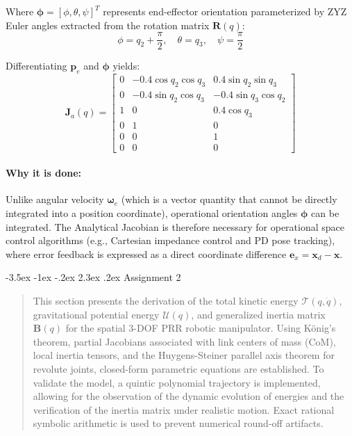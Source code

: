 \documentclass[11pt, a4paper]{article}
\makeatletter
\renewcommand{\section}{\@startsection{section}{1}{\z@}%
    {-3.5ex \@plus -1ex \@minus -.2ex}%
    {2.3ex \@plus .2ex}%
    {\normalfont\Large\bfseries\color{brandblue}}}
\makeatother
\begin{document}
Where $\boldsymbol{\phi} = [\phi, \theta, \psi]^T$ represents end-effector orientation parameterized by ZYZ Euler angles extracted from the rotation matrix $\mathbf{R}(q)$:
\begin{equation}
    \phi = q_2 + \frac{\pi}{2}, \quad \theta = q_3, \quad \psi = \frac{\pi}{2}
\end{equation}

Differentiating $\mathbf{p}_e$ and $\boldsymbol{\phi}$ yields:
\begin{equation}
\mathbf{J}_a(q) = \begin{bmatrix}
0 & -0.4 \cos q_2 \cos q_3 & 0.4 \sin q_2 \sin q_3 \\
0 & -0.4 \sin q_2 \cos q_3 & -0.4 \sin q_3 \cos q_2 \\
1 & 0 & 0.4 \cos q_3 \\
0 & 1 & 0 \\
0 & 0 & 1 \\
0 & 0 & 0
\end{bmatrix}
\end{equation}

\paragraph{Why it is done:}
Unlike angular velocity $\boldsymbol{\omega}_e$ (which is a vector quantity that cannot be directly integrated into a position coordinate), operational orientation angles $\boldsymbol{\phi}$ can be integrated. The Analytical Jacobian is therefore necessary for operational space control algorithms (e.g., Cartesian impedance control and PD pose tracking), where error feedback is expressed as a direct coordinate difference $\mathbf{e}_x = \mathbf{x}_d - \mathbf{x}$.

\newpage

\section{Assignment 2}
\label{sec:assignment2}

\begin{abstract}
\noindent
This section presents the derivation of the total kinetic energy $\mathcal{T}(q, \dot{q})$, gravitational potential energy $\mathcal{U}(q)$, and generalized inertia matrix $\mathbf{B}(q)$ for the spatial 3-DOF PRR robotic manipulator. Using König's theorem, partial Jacobians associated with link centers of mass (CoM), local inertia tensors, and the Huygens-Steiner parallel axis theorem for revolute joints, closed-form parametric equations are established. To validate the model, a quintic polynomial trajectory is implemented, allowing for the observation of the dynamic evolution of energies and the verification of the inertia matrix under realistic motion. Exact rational symbolic arithmetic is used to prevent numerical round-off artifacts.
\end{abstract}
\end{document}
